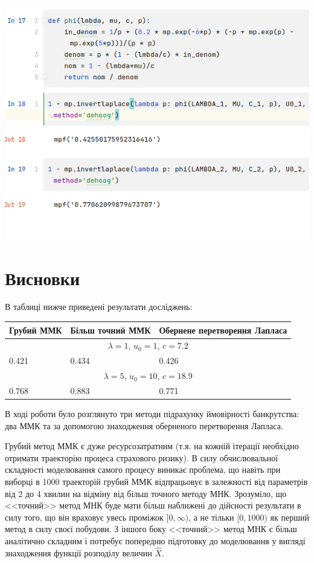 \documentclass{article}
\begin{document}
    \includegraphics[scale=0.5]{img/2021-10-11-17-27-01.png}

    \section{Висновки}

    В таблиці нижче приведені результати досліджень:

    \begin{tabular}{@{}|l|l|l|@{}}
    \toprule
    Грубий ММК & Більш точний ММК & Обернене перетворення Лапласа \\ \midrule
    \multicolumn{3}{|c|}{$\lambda = 1$, $u_0 = 1$, $c = 7.2$}       \\\hline
    0.421      & 0.434            & 0.426                         \\\hline
    \multicolumn{3}{|c|}{$\lambda = 5$, $u_0 = 10$, $c = 18.9$}     \\\hline
    0.768      & 0.883            & 0.771                         \\ \bottomrule
    \end{tabular}

    
    В ході роботи було розглянуто три методи підрахунку ймовірності банкрутства: два ММК та за 
    допомогою знаходження оберненого перетворення Лапласа. 


    Грубий метод ММК є дуже ресурсозатратним (т.я. на кожній ітерації необхідно отримати траекторію 
    процеса страхового ризику). В силу обчислювальної складності моделювання самого процесу 
    виникає проблема, що навіть при виборці в 1000 траекторій грубий ММК відпрацьовує в залежності 
    від параметрів від 2 до 4 хвилин на відміну від більш точного методу МНК. Зрозуміло, що 
    <<точний>> метод МНК буде мати більш наближені до дійсності результати в силу того, що 
    він враховує увесь проміжок $[0, \infty)$, а не тільки $[0, 1000)$ як перший метод в силу 
    своєї побудови. З іншого боку <<точний>> метод МНК є більш аналітично складним і потребує 
    попередню підготовку до моделювання у вигляді знаходження функції розподілу величин $\hat{X}$. 
\end{document}
